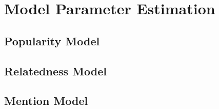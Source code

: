\section{Model Parameter Estimation}

\subsection{Popularity Model} 


\subsection{Relatedness Model}


\subsection{Mention Model}